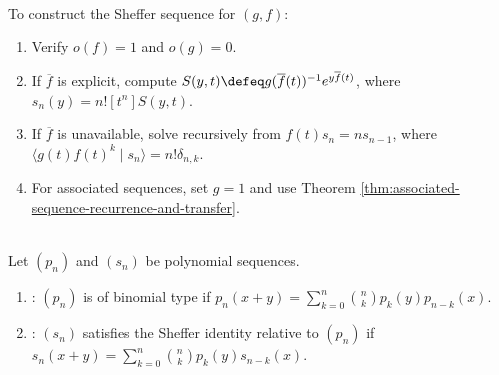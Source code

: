 \begin{method} \label{meth:building-sheffer-sequences} \\
To construct the Sheffer sequence for $(g,f)$:
\begin{enumerate}[label=(\roman*)]
\setlength{\itemsep}{0pt}
\item Verify $o(f)=1$ and $o(g)=0$.
\item If $\overline f$ is explicit, compute $S(y,t)\defeq g(\overline f(t))^{-1}e^{y\overline f(t)}$, where $s_n(y)=n![t^n]S(y,t)$.
\item If $\overline f$ is unavailable, solve recursively from $f(t)s_n=ns_{n-1}$, where $\langle g(t)f(t)^k\mid s_n\rangle=n!\delta_{n,k}$.
\item For associated sequences, set $g=1$ and use Theorem
\ref{thm:associated-sequence-recurrence-and-transfer}.
\end{enumerate}
\end{method}

\begin{definition} \label{def:binomial-type-and-sheffer-identity} \\
Let $(p_n)$ and $(s_n)$ be polynomial sequences.
\begin{enumerate}[label=(\roman*)]
\setlength{\itemsep}{0pt}
\item {}: $(p_n)$ is of binomial type if $p_n(x+y)=\sum\limits_{k=0}^{n}\binom{n}{k}p_k(y)p_{n-k}(x)$.
\item {}: $(s_n)$ satisfies the Sheffer identity relative to $(p_n)$ if $s_n(x+y)=\sum\limits_{k=0}^{n}\binom{n}{k}p_k(y)s_{n-k}(x)$.
\end{enumerate}
\end{definition}

